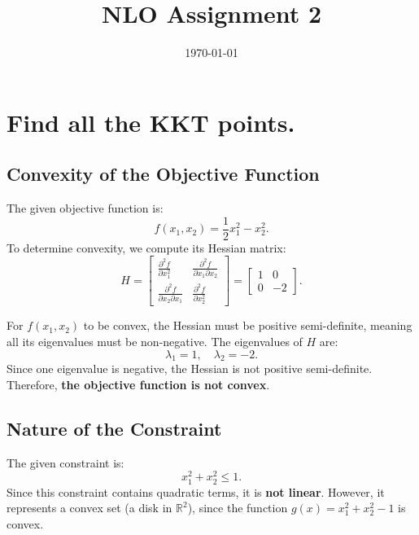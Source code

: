 \documentclass{article}
\begin{document}
\title{NLO Assignment 2}
\author{}
\date{\today}
\maketitle

\section{Find all the KKT points.}\label{sec:a}



\subsection{Convexity of the Objective Function}
The given objective function is:
\begin{equation}
f(x_1, x_2) = \frac{1}{2}x_1^2 - x_2^2.
\end{equation}
To determine convexity, we compute its Hessian matrix:
\begin{equation}
H = \begin{bmatrix} 
\frac{\partial^2 f}{\partial x_1^2} & \frac{\partial^2 f}{\partial x_1 \partial x_2} \\ 
\frac{\partial^2 f}{\partial x_2 \partial x_1} & \frac{\partial^2 f}{\partial x_2^2} 
\end{bmatrix}
=
\begin{bmatrix} 
1 & 0 \\ 
0 & -2 
\end{bmatrix}.
\end{equation}

For $f(x_1, x_2)$ to be convex, the Hessian must be positive semi-definite, meaning all its eigenvalues must be non-negative. The eigenvalues of $H$ are:
\begin{equation}
\lambda_1 = 1, \quad \lambda_2 = -2.
\end{equation}
Since one eigenvalue is negative, the Hessian is not positive semi-definite. Therefore, \textbf{the objective function is not convex}.

\subsection{Nature of the Constraint}
The given constraint is:
\begin{equation}
x_1^2 + x_2^2 \leq 1.
\end{equation}
Since this constraint contains quadratic terms, it is \textbf{not linear}. However, it represents a convex set (a disk in $\mathbb{R}^2$), since the function $g(x) = x_1^2 + x_2^2 - 1$ is convex.
\end{document}
